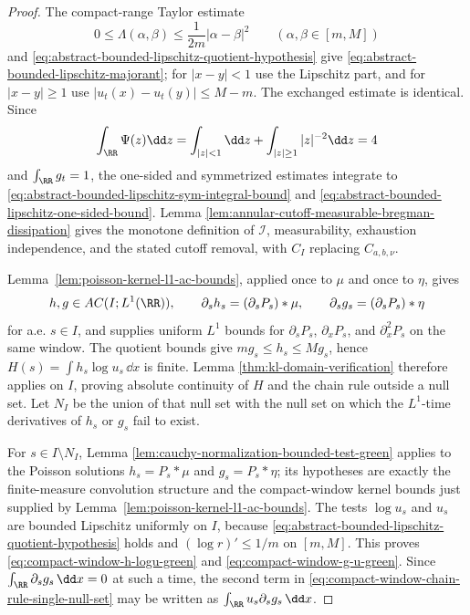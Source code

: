 \begin{proof}
The compact-range Taylor estimate
\[
0\le\Lambda(\alpha,\beta)\le\frac{1}{2m}|\alpha-\beta|^2
\qquad(\alpha,\beta\in[m,M])
\]
and \eqref{eq:abstract-bounded-lipschitz-quotient-hypothesis} give
\eqref{eq:abstract-bounded-lipschitz-majorant}; for \(|x-y|<1\) use the
Lipschitz part, and for \(|x-y|\ge1\) use \(|u_t(x)-u_t(y)|\le M-m\).  The
exchanged estimate is identical.  Since
\[
\int_{\RR}\Psi(z)\dd z
=\int_{|z|<1}\dd z+\int_{|z|\ge1}|z|^{-2}\dd z=4
\]
and \(\int_{\RR}g_t=1\), the one-sided and symmetrized estimates integrate to
\eqref{eq:abstract-bounded-lipschitz-sym-integral-bound} and
\eqref{eq:abstract-bounded-lipschitz-one-sided-bound}.  Lemma
\ref{lem:annular-cutoff-measurable-bregman-dissipation} gives the monotone
definition of \(\mathscr I\), measurability, exhaustion independence, and the
stated cutoff removal, with \(C_I\) replacing \(C_{a,b,\nu}\).

Lemma~\ref{lem:poisson-kernel-l1-ac-bounds}, applied once to \(\mu\) and
once to \(\eta\), gives
\[
h,g\in AC(I;L^1(\RR)),\qquad
\partial_s h_s=(\partial_sP_s)*\mu,\qquad
\partial_s g_s=(\partial_sP_s)*\eta
\]
for a.e. \(s\in I\), and supplies uniform \(L^1\) bounds for
\(\partial_sP_s\), \(\partial_xP_s\), and \(\partial_x^2P_s\) on the same
window.  The quotient bounds give \(m g_s\le h_s\le M g_s\), hence
\(H(s)=\int h_s\log u_s\,\dd x\) is finite.  Lemma
\ref{thm:kl-domain-verification} therefore applies on \(I\), proving absolute
continuity of \(H\) and the chain rule outside a null set.  Let \(N_I\) be
the union of that null set with the null set on which the \(L^1\)-time
derivatives of \(h_s\) or \(g_s\) fail to exist.

For \(s\in I\setminus N_I\), Lemma
\ref{lem:cauchy-normalization-bounded-test-green} applies to the Poisson
solutions \(h_s=P_s*\mu\) and \(g_s=P_s*\eta\); its hypotheses are exactly
the finite-measure convolution structure and the compact-window kernel
bounds just supplied by Lemma~\ref{lem:poisson-kernel-l1-ac-bounds}.  The
tests \(\log u_s\) and \(u_s\) are bounded Lipschitz uniformly on \(I\), because
\eqref{eq:abstract-bounded-lipschitz-quotient-hypothesis} holds and
\((\log r)'\le1/m\) on \([m,M]\).  This proves
\eqref{eq:compact-window-h-logu-green} and
\eqref{eq:compact-window-g-u-green}.  Since \(\int_{\RR}\partial_sg_s\,\dd x=0\)
at such a time, the second term in
\eqref{eq:compact-window-chain-rule-single-null-set} may be written as
\(\int_{\RR}u_s\partial_sg_s\,\dd x\).


\end{proof}
